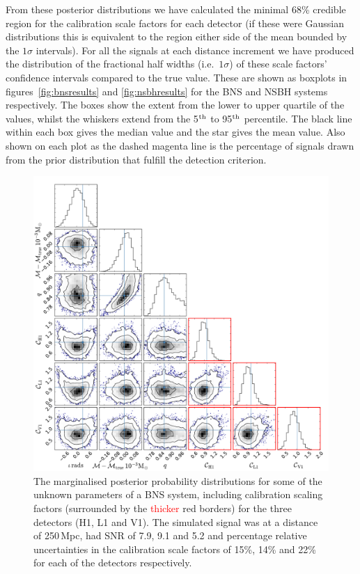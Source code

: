 \documentclass[prd, twocolumn, lengthcheck, superscriptaddress, showpacs, letterpaper, nofootinbib]{revtex4-1}
\newcommand{\refresp}[1]{\textcolor{red}{#1}}
\begin{document}
From these posterior distributions we have calculated the minimal 68\% credible
region for the calibration scale factors for each detector (if these were
Gaussian distributions this is equivalent to the region either side of the mean
bounded by the $1\sigma$ intervals). For all the signals at each distance
increment we have produced the distribution of the fractional half widths
(i.e.\ $1\sigma$) of these scale factors' confidence intervals compared to the
true value. These are shown as boxplots in figures~\ref{fig:bnsresults} and
\ref{fig:nsbhresults} for the \ac{BNS} and \ac{NSBH} systems respectively. The
boxes show the extent from the lower to upper quartile of the values, whilst
the whiskers extend from the 5$^{\rm th}$ to 95$^{\rm th}$ percentile. The
black line within each box gives the median value and the star gives the mean
value. Also shown on each plot as the dashed magenta line is the percentage of
signals drawn from the prior distribution that fulfill the detection criterion.

\begin{figure}
 \begin{center}
  \includegraphics[width=1.0\textwidth]{bns_post_fig.pdf}
 \end{center}
 \caption{\label{fig:bnspost} The marginalised posterior probability distributions for some of the unknown
 parameters of a \ac{BNS} system, including calibration scaling factors (surrounded by the 
\refresp{thicker} red 
borders) for the three detectors (H1, L1 and V1). The simulated signal was at a distance of 
250\,Mpc, had \ac{SNR} of 7.9, 9.1 and 5.2 and percentage relative uncertainties in the calibration 
scale factors of 15\%, 14\% and 22\% for each of the detectors respectively.}
\end{figure}
\end{document}
